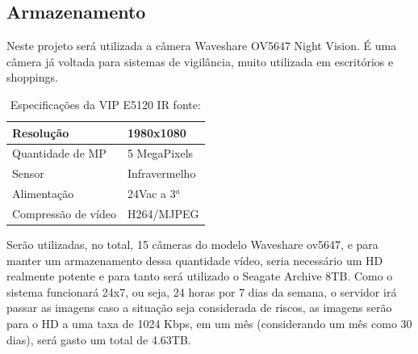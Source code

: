 \subsection{Armazenamento}

	Neste projeto será utilizada a câmera Waveshare OV5647 Night Vision. É uma câmera já voltada para sistemas de vigilância, muito utilizada em escritórios e shoppings.

	\begin{table}[H]
		\centering
		\begin{tabular}{|l|l|}
			\hline
			Resolução           & 1980x1080       \\ \hline
			Quantidade de MP    & 5 MegaPixels \\ \hline
			Sensor              & Infravermelho  \\ \hline
			Alimentação         & 24Vac a 3$^a$  \\ \hline
			Compressão de vídeo & H264/MJPEG     \\ \hline
		\end{tabular}
		\caption{Especificações da VIP E5120 IR fonte: \cite{mercadoLivreVIPE5120}}
		\label{my-label}
	\end{table}

	Serão utilizadas, no total, 15 câmeras do modelo  Waveshare ov5647, e para manter um armazenamento dessa quantidade vídeo, seria necessário um HD realmente potente e para tanto será utilizado o Seagate Archive 8TB. Como o sistema funcionará  24x7, ou seja, 24 horas por 7 dias da semana, o servidor irá passar as imagens caso a situação seja considerada de riscos, as imagens serão para o HD a uma taxa de 1024 Kbps, em um mês (considerando um mês como 30 dias), será gasto um total de 4.63TB.

